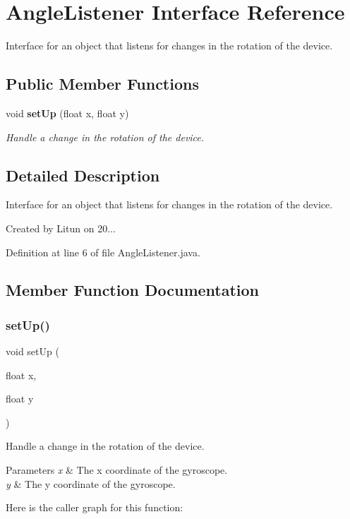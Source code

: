 \section{Angle\+Listener Interface Reference}
\label{interfacesf_1_1unitingtwist_1_1_angle_listener}


Interface for an object that listens for changes in the rotation of the device.  


\subsection*{Public Member Functions}
\begin{DoxyCompactItemize}
\item 
void \textbf{ set\+Up} (float x, float y)
\begin{DoxyCompactList}\small\item\em Handle a change in the rotation of the device. \end{DoxyCompactList}\end{DoxyCompactItemize}


\subsection{Detailed Description}
Interface for an object that listens for changes in the rotation of the device. 

Created by Litun on 20... 

Definition at line 6 of file Angle\+Listener.\+java.



\subsection{Member Function Documentation}
\mbox{\label{interfacesf_1_1unitingtwist_1_1_angle_listener_a2e4912428e9969f71dff31060f2debf5}} 
\subsubsection{set\+Up()}
{\footnotesize\ttfamily void set\+Up (\begin{DoxyParamCaption}\item[{float}]{x,  }\item[{float}]{y }\end{DoxyParamCaption})}



Handle a change in the rotation of the device. 


\begin{DoxyParams}{Parameters}
{\em x} & The x coordinate of the gyroscope. \\
\hline
{\em y} & The y coordinate of the gyroscope. \\
\hline
\end{DoxyParams}
Here is the caller graph for this function\+:
